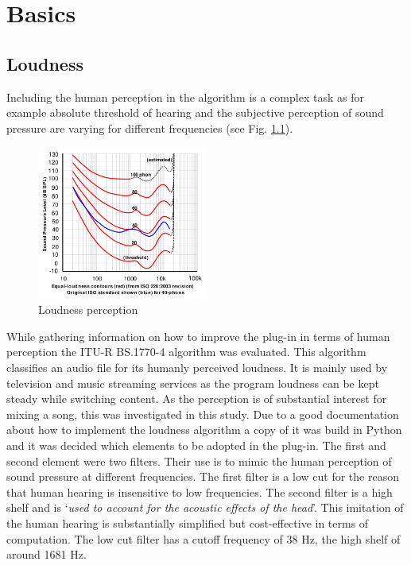 \chapter{Basics}
\label{chapter:basics}

\section{Loudness}

Including the human perception in the algorithm is a complex task as for example absolute threshold of hearing and the subjective perception of sound pressure are varying for different frequencies (see Fig. \ref{LDNSGraph}).\\

\begin{figure}[H]
\includegraphics[width=0.5\textwidth]{images/loudnessGraph}
	\centering
	\caption{Loudness perception\cite{wikiLoud}}
	\label{LDNSGraph}
\end{figure}

While gathering information on how to improve the plug-in in terms of human perception the ITU-R BS.1770-4\cite{ITUalgo} algorithm was evaluated. This algorithm classifies an audio file for its humanly perceived loudness. It is mainly used by television and music streaming services as the program loudness can be kept steady while switching content. As the perception is of substantial interest for mixing a song, this was investigated in this study. Due to a good documentation about how to implement the loudness algorithm a copy of it was build in Python and it was decided which elements to be adopted in the plug-in. The first and second element were two filters. Their use is to mimic the human perception of sound pressure at different frequencies. The first filter is a low cut for the reason that human hearing is insensitive to low frequencies. The second filter is a high shelf and is ‘\textit{used to account for the acoustic effects of the head}’\cite{ITUalgo}. This imitation of the human hearing is substantially simplified but cost-effective in terms of computation. The low cut filter has a cutoff frequency of 38 Hz, the high shelf of around 1681 Hz.\\

